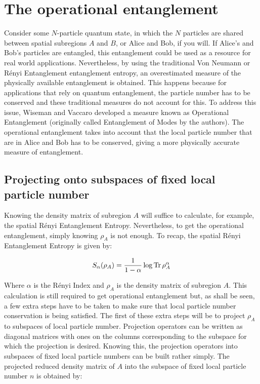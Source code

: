 \section{The operational entanglement}

Consider some $N$-particle quantum state, in which the $N$ particles are shared between spatial subregions $A$ and $B$, or Alice and Bob, if you will. If Alice's and Bob's particles are entangled, this entanglement could be used as a resource for real world applications. Nevertheless, by using the traditional Von Neumann or R\'enyi Entanglement entanglement entropy, an overestimated measure of the physically available entanglement is obtained. This happens because for applications that rely on quantum entanglement, the particle number has to be conserved and these traditional measures do not account for this. To address this issue, Wiseman and Vaccaro \cite{PhysRevLett.91.097902} developed a measure known as Operational Entanglement (originally called Entanglement of Modes by the authors). The operational entanglement takes into account that the local particle number that are in Alice and Bob has to be conserved, giving a more physically accurate measure of entanglement.

	\subsection{Projecting onto subspaces of fixed local particle number}
	
	Knowing the density matrix of subregion $A$ will suffice to calculate, for example, the spatial R\'enyi Entanglement Entropy. Nevertheless, to get the operational entanglement, simply knowing $\rho_{A}$ is not enough. To recap, the spatial R\'enyi Entanglement Entropy is given by:
	

\begin{equation}
 S_{\alpha}(\rho_{A}) = \frac{1}{1-\alpha} \log{\operatorname{Tr}{\rho_{A}^{\alpha}}} 
\end{equation}

Where $\alpha$ is the R\'enyi Index and $\rho_{A}$ is the density matrix of subregion $A$. This calculation is still required to get operational entanglement but, as shall be seen, a few extra steps have to be taken to make sure that local particle number conservation is being satisfied. The first of these extra steps will be to project $\rho_{A}$ to subspaces of local particle number. Projection operators can be written as diagonal matrices with ones on the columns corresponding to the subspace for which the projection is desired. Knowing this, the projection operators into subspaces of fixed local particle numbers can be built rather simply. The projected reduced density matrix of  $A$ into the subspace of fixed local particle number $n$ is obtained by:

